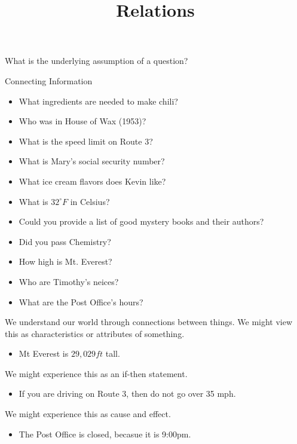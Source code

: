 \documentclass{ximera}
\title{Relations}
\begin{document}
\begin{abstract}

\end{abstract}
\maketitle


What is the underlying assumption of a question?


\begin{observation} Connecting Information

\begin{itemize} 
\item What ingredients are needed to make chili?
\item Who was in House of Wax (1953)?
\item What is the speed limit on Route 3?
\item What is Mary's social security number?
\item What ice cream flavors does Kevin like?
\item What is $32^\circ F$ in Celsius?
\item Could you provide a list of good mystery books and their authors?
\item Did you pass Chemistry?
\item How high is Mt. Everest?
\item Who are Timothy's neices?
\item What are the Post Office's hours?
\end{itemize}

We understand our world through connections between things. We might view this as characteristics or attributes of something. 
\begin{itemize}
\item Mt Everest is $29,029 ft$ tall.
\end{itemize}


We might experience this as an if-then statement.
\begin{itemize}
\item If you are driving on Route 3, then do not go over 35 mph.
\end{itemize}



We might experience this as cause and effect.
\begin{itemize}
\item The Post Office is closed, becasue it is 9:00pm.
\end{itemize}

\end{observation}
\end{document}
